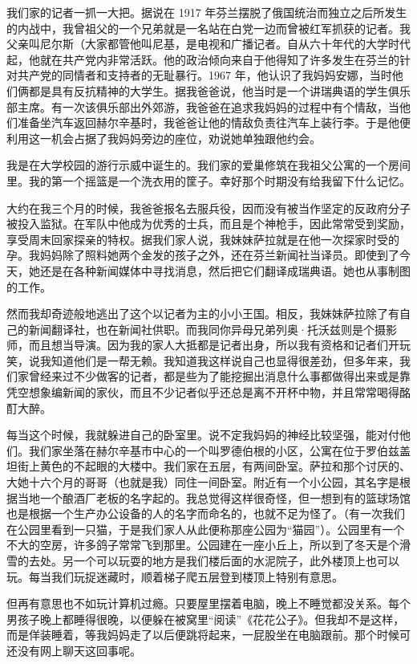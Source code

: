 我们家的记者一抓一大把。据说在 1917 年芬兰摆脱了俄国统治而独立之后所发生的内战中，我曾祖父的一个兄弟就是一名站在白党一边而曾被红军抓获的记者。我父亲叫尼尔斯（大家都管他叫尼基，是电视和广播记者。自从六十年代的大学时代起，他就在共产党内非常活跃。他的政治倾向来自于他得知了许多发生在芬兰的针对共产党的同情者和支持者的无耻暴行。1967 年，他认识了我妈妈安娜，当时他们俩都是具有反抗精神的大学生。据我爸爸说，他当时是一个讲瑞典语的学生俱乐部主席。有一次该俱乐部出外郊游，我爸爸在追求我妈妈的过程中有个情敌，当他们准备坐汽车返回赫尔辛基时，我爸爸让他的情敌负责往汽车上装行李。于是他便利用这一机会占据了我妈妈旁边的座位，劝说她单独跟他约会。

我是在大学校园的游行示威中诞生的。我们家的爱巢修筑在我祖父公寓的一个房间里。我的第一个摇篮是一个洗衣用的筐子。幸好那个时期没有给我留下什么记忆。

大约在我三个月的时候，我爸爸报名去服兵役，因而没有被当作坚定的反政府分子被投入监狱。在军队中他成为优秀的士兵，而且是个神枪手，因此常常受到奖励，享受周末回家探亲的特权。据我们家人说，我妹妹萨拉就是在他一次探家时受的孕。我妈妈除了照料她两个金发的孩子之外，还在芬兰新闻社当译员。即使到了今天，她还是在各种新闻媒体中寻找消息，然后把它们翻译成瑞典语。她也从事制图的工作。

然而我却奇迹般地逃出了这个以记者为主的小小王国。相反，我妹妹萨拉除了有自己的新闻翻译社，也在新闻社供职。而我同你异母兄弟列奥·托沃兹则是个摄影师，而且想当导演。因为我的家人大抵都是记者出身，所以我有资格和记者们开玩笑，说我知道他们是一帮无赖。我知道我这样说自己也显得很差劲，但多年来，我们家曾经来过不少做客的记者，都是些为了能挖掘出消息什么事都做得出来或是靠凭空想象编新闻的家伙，而且不少记者似乎还总是离不开杯中物，并且常常喝得酩酊大醉。

每当这个时候，我就躲进自己的卧室里。说不定我妈妈的神经比较坚强，能对付他们。我们家坐落在赫尔辛基市中心的一个叫罗德伯根的小区，公寓在位于罗伯兹盖坦街上黄色的不起眼的大楼中。我们家在五层，有两间卧室。萨拉和那个讨厌的、大她十六个月的哥哥（也就是我）同住一间卧室。附近有一个小公园，其名字是根据当地一个酿酒厂老板的名字起的。我总觉得这样很奇怪，但一想到有的篮球场馆也是根据一个生产办公设备的人的名字而命名的，也就不足为怪了。（有一次我们在公园里看到一只猫，于是我们家人从此便称那座公园为“猫园”）。公园里有一个不大的空房，许多鸽子常常飞到那里。公园建在一座小丘上，所以到了冬天是个滑雪的去处。另一个可以玩耍的地方是我们楼后面的水泥院子，此外楼顶上也可以玩。每当我们玩捉迷藏时，顺着梯子爬五层登到楼顶上特别有意思。

但再有意思也不如玩计算机过瘾。只要屋里摆着电脑，晚上不睡觉都没关系。每个男孩子晚上都睡得很晚，以便躲在被窝里“阅读”《花花公子》。但我却不是这样，而是佯装睡着，等我妈妈走了以后便跳将起来，一屁股坐在电脑跟前。那个时候可还没有网上聊天这回事呢。

